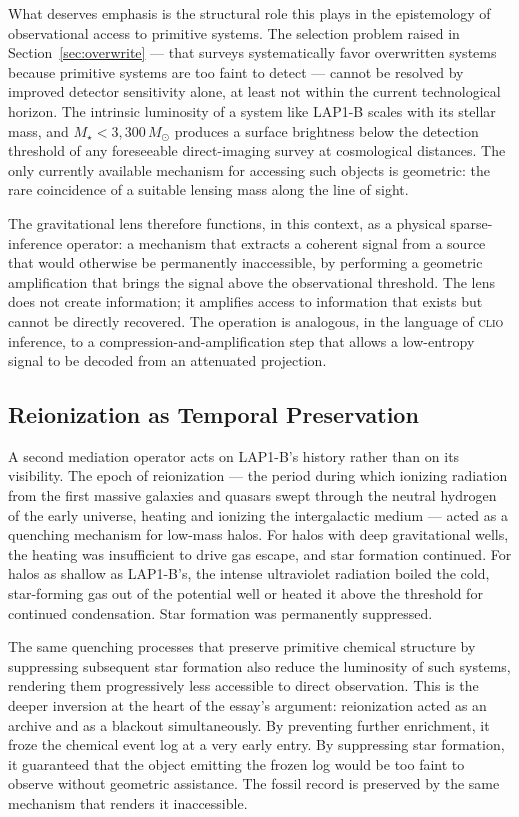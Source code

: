 \documentclass[12pt, a4paper]{article}
\newcommand{\Msun}{M_{\odot}}
\newcommand{\Mstar}{M_{\star}}
\newcommand{\CLIO}{\textsc{clio}}
\theoremstyle{definition}
\begin{document}
What deserves emphasis is the structural role this plays in the epistemology
of observational access to primitive systems. The selection problem raised in
Section~\ref{sec:overwrite} --- that surveys systematically favor overwritten
systems because primitive systems are too faint to detect --- cannot be
resolved by improved detector sensitivity alone, at least not within the
current technological horizon. The intrinsic luminosity of a system like
LAP1-B scales with its stellar mass, and $\Mstar < 3{,}300\,\Msun$ produces
a surface brightness below the detection threshold of any foreseeable
direct-imaging survey at cosmological distances. The only currently available
mechanism for accessing such objects is geometric: the rare coincidence of a
suitable lensing mass along the line of sight.

The gravitational lens therefore functions, in this context, as a physical
sparse-inference operator: a mechanism that extracts a coherent signal from
a source that would otherwise be permanently inaccessible, by performing a
geometric amplification that brings the signal above the observational
threshold. The lens does not create information; it amplifies access to
information that exists but cannot be directly recovered. The operation is
analogous, in the language of \CLIO{} inference, to a compression-and-amplification
step that allows a low-entropy signal to be decoded from an attenuated projection.

\subsection{Reionization as Temporal Preservation}

A second mediation operator acts on LAP1-B's history rather than on its
visibility. The epoch of reionization --- the period during which ionizing
radiation from the first massive galaxies and quasars swept through the
neutral hydrogen of the early universe, heating and ionizing the intergalactic
medium --- acted as a quenching mechanism for low-mass halos. For halos with
deep gravitational wells, the heating was insufficient to drive gas escape,
and star formation continued. For halos as shallow as LAP1-B's, the intense
ultraviolet radiation boiled the cold, star-forming gas out of the potential
well or heated it above the threshold for continued condensation. Star
formation was permanently suppressed.

The same quenching processes that preserve primitive chemical structure by
suppressing subsequent star formation also reduce the luminosity of such
systems, rendering them progressively less accessible to direct observation.
This is the deeper inversion at the heart of the essay's argument:
reionization acted as an archive and as a blackout simultaneously. By
preventing further enrichment, it froze the chemical event log at a very
early entry. By suppressing star formation, it guaranteed that the object
emitting the frozen log would be too faint to observe without geometric
assistance. The fossil record is preserved by the same mechanism that renders
it inaccessible.
\end{document}

